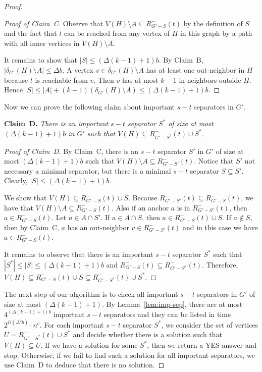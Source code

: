 \documentclass[11pt,a4paper]{article}
\begin{document}
\begin{proof}
\begin{proof}[Proof of Claim~C]
Observe that $V(H)\setminus A\subseteq R_{G'-S}^-(t)$ by the definition of $S$ and the fact that $t$ can be reached from any
vertex of $H$ in this graph by a path with all inner vertices in $V(H)\setminus A$.

It remains to show that $|S|\leq (\Delta(k-1)+1)b$.  By Claim~B, $|\delta_{G'}(H)\setminus A|\leq \Delta b$. A
vertex $v\in \delta_{G'}(H)\setminus A$ has at least one out-neighbor in $H$ because $t$ is reachable from $v$. Then $v$ has
at most $k-1$ in-neighbors outside $H$. Hence $|S|\leq |A|+(k-1)(\delta_{G'}(H)\setminus A)\leq (\Delta(k-1)+1)b$.
\end{proof}

Now we can prove the following claim about important $s-t$ separators in $G'$.

\medskip
\noindent
{\bf Claim~D.} {\it
There is an important $s-t$ separator $S^*$ of size at most $(\Delta(k-1)+1)b$ in $G'$ such that $V(H)\subseteq
R_{G'-S^*}^-(t)\cup S^*$.
}



\begin{proof}[Proof of Claim~D]
By Claim~C, there is an $s-t$ separator $S'$ in $G'$ of size at most $(\Delta(k-1)+1)b$ such that $V(H)\setminus
A\subseteq R_{G'-S'}^-(t)$. Notice that $S'$ not necessary a minimal separator, but there is a minimal $s-t$ separator
$S\subseteq S'$. Clearly, $|S|\leq (\Delta(k-1)+1)b$.

We show that  $V(H)\subseteq R_{G'-S}^-(t)\cup S$.  
Because $R_{G'-S'}^-(t)\subseteq  R_{G'-S}^-(t)$, we have that $V(H)\setminus A\subseteq R_{G'-S}^-(t)$. Also if an anchor $a$
is in  $R_{G'-S'}^-(t)$, then $a\in R_{G'-S}^-(t)$. Let $a\in A\cap S'$. If $a\in A\cap S$, then $a\in R_{G'-S}^-(t)\cup S$.
If  $a\notin S$, then by Claim~C, $a$ has an out-neighbor $v\in R_{G'-S'}^-(t)$ and in this case we have $a\in
R_{G'-S}^-(t)$.

It remains to observe that there is an important $s-t$ separator $S^*$ such that $|S^*|\leq |S|\leq (\Delta(k-1)+1)b$ and
$R_{G'-S}^-(t)\subseteq   R_{G'-S^*}^-(t)$. Therefore, $V(H)\subseteq R_{G'-S}^-(t)\cup S\subseteq R_{G'-S^*}^-(t)\cup S^*$.
\end{proof}

The next step of our algorithm is to check all important $s-t$ separators in $G'$ of size at most  $(\Delta(k-1)+1)$. By
Lemma~\ref{lem:imp-sep}, there are at most $4^{(\Delta(k-1)+1)b}$ important $s-t$ separators and they can be listed in time
$2^{O(\Delta^2b)}\cdot n^c$. For each important $s-t$ separator $S^*$, we consider the set of vertices $U= R_{G'-S^*}^-(t)\cup
S^*$ and decide whether there is a solution such that $V(H)\subseteq U$. If we have a solution for some $S^*$, then we return
a YES-answer and stop. Otherwise, if we fail  to find such a solution for all important separators, we use
Claim~D  to deduce that there is no solution.


\end{proof}
\end{document}
